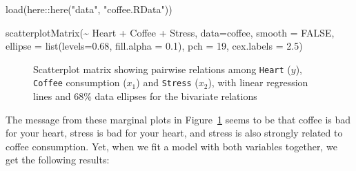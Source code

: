 \documentclass[
  letterpaper,
  10pt,
  krantz2]{krantz}
\makeatletter
\newenvironment{Shaded}{\begin{snugshade}}{\end{snugshade}}
\newcommand{\AttributeTok}[1]{\textcolor[rgb]{0.40,0.45,0.13}{#1}}
\newcommand{\ConstantTok}[1]{\textcolor[rgb]{0.56,0.35,0.01}{#1}}
\newcommand{\DecValTok}[1]{\textcolor[rgb]{0.68,0.00,0.00}{#1}}
\newcommand{\FloatTok}[1]{\textcolor[rgb]{0.68,0.00,0.00}{#1}}
\newcommand{\FunctionTok}[1]{\textcolor[rgb]{0.28,0.35,0.67}{#1}}
\newcommand{\NormalTok}[1]{\textcolor[rgb]{0.00,0.23,0.31}{#1}}
\newcommand{\SpecialCharTok}[1]{\textcolor[rgb]{0.37,0.37,0.37}{#1}}
\newcommand{\StringTok}[1]{\textcolor[rgb]{0.13,0.47,0.30}{#1}}
\newenvironment{kframe}{%
  \medskip{}
  \setlength{\fboxsep}{.8em}
  \def\at@end@of@kframe{}%
  \ifinner\ifhmode%
  \def\at@end@of@kframe{\end{minipage}}%
  \begin{minipage}{\columnwidth}%
  \fi\fi%
  \def\FrameCommand##1{\hskip\@totalleftmargin \hskip-\fboxsep
  \colorbox{shadecolor}{##1}\hskip-\fboxsep
      \hskip-\linewidth \hskip-\@totalleftmargin \hskip\columnwidth}%
  \MakeFramed {\advance\hsize-\width
    \@totalleftmargin\z@ \linewidth\hsize
    \@setminipage}}%
{\par\unskip\endMakeFramed%
  \at@end@of@kframe}
\renewenvironment{Shaded}{\begin{kframe}}{\end{kframe}}
\makeatother
\begin{document}
\begin{Shaded}
\begin{Highlighting}[]
\FunctionTok{load}\NormalTok{(here}\SpecialCharTok{::}\FunctionTok{here}\NormalTok{(}\StringTok{"data"}\NormalTok{, }\StringTok{"coffee.RData"}\NormalTok{))}

\FunctionTok{scatterplotMatrix}\NormalTok{(}\SpecialCharTok{\textasciitilde{}}\NormalTok{ Heart }\SpecialCharTok{+}\NormalTok{ Coffee }\SpecialCharTok{+}\NormalTok{ Stress, }
  \AttributeTok{data=}\NormalTok{coffee,}
  \AttributeTok{smooth =} \ConstantTok{FALSE}\NormalTok{,}
  \AttributeTok{ellipse =} \FunctionTok{list}\NormalTok{(}\AttributeTok{levels=}\FloatTok{0.68}\NormalTok{, }\AttributeTok{fill.alpha =} \FloatTok{0.1}\NormalTok{),}
  \AttributeTok{pch =} \DecValTok{19}\NormalTok{, }\AttributeTok{cex.labels =} \FloatTok{2.5}\NormalTok{)}
\end{Highlighting}
\end{Shaded}

\begin{figure}[H]


\caption{\label{fig-coffee-spm}Scatterplot matrix showing pairwise
relations among \texttt{Heart} (\(y\)), \texttt{Coffee} consumption
(\(x_1\)) and \texttt{Stress} (\(x_2\)), with linear regression lines
and 68\% data ellipses for the bivariate relations}

\end{figure}%

The message from these marginal plots in Figure~\ref{fig-coffee-spm}
seems to be that coffee is bad for your heart, stress is bad for your
heart, and stress is also strongly related to coffee consumption. Yet,
when we fit a model with both variables together, we get the following
results:
\end{document}
